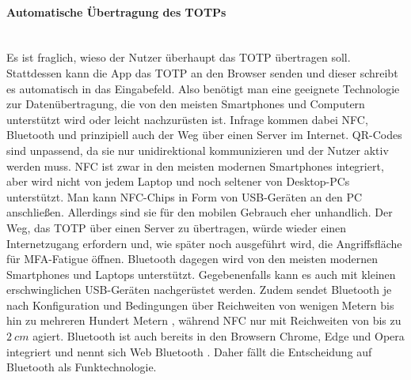 \paragraph*{Automatische Übertragung des TOTPs}
\mbox{} \vspace{0.1cm} \\
Es ist fraglich, wieso der Nutzer überhaupt das TOTP übertragen soll. 
Stattdessen kann die App das TOTP an den Browser senden und dieser schreibt es 
automatisch in das Eingabefeld. Also benötigt man eine geeignete Technologie zur 
Datenübertragung, die von den meisten Smartphones und Computern unterstützt wird 
oder leicht nachzurüsten ist. Infrage kommen dabei NFC, Bluetooth und prinzipiell 
auch der Weg über einen Server im Internet. QR-Codes sind unpassend, da sie nur 
unidirektional kommunizieren und der Nutzer aktiv werden muss. NFC ist zwar in 
den meisten modernen Smartphones integriert, aber wird nicht von jedem Laptop und 
noch seltener von Desktop-PCs unterstützt. Man kann NFC-Chips in 
Form von USB-Geräten an den PC anschließen. Allerdings sind sie für den mobilen 
Gebrauch eher unhandlich. Der Weg, das TOTP über einen Server zu übertragen, 
würde wieder einen Internetzugang erfordern und, wie später noch ausgeführt wird, 
die Angriffsfläche für MFA-Fatigue öffnen. Bluetooth dagegen wird von den meisten 
modernen Smartphones und Laptops unterstützt. Gegebenenfalls kann es auch mit kleinen 
erschwinglichen USB-Geräten nachgerüstet werden. Zudem sendet Bluetooth je nach 
Konfiguration und Bedingungen über Reichweiten von wenigen Metern bis hin zu 
mehreren Hundert Metern \autocite{btEstimator}, während NFC nur mit Reichweiten von bis zu $2~cm$ \autocite{nfcForum} 
agiert. Bluetooth ist auch bereits in den Browsern Chrome, Edge und Opera 
integriert und nennt sich Web Bluetooth \autocite{webBt}. Daher fällt die 
Entscheidung auf Bluetooth als Funktechnologie.


